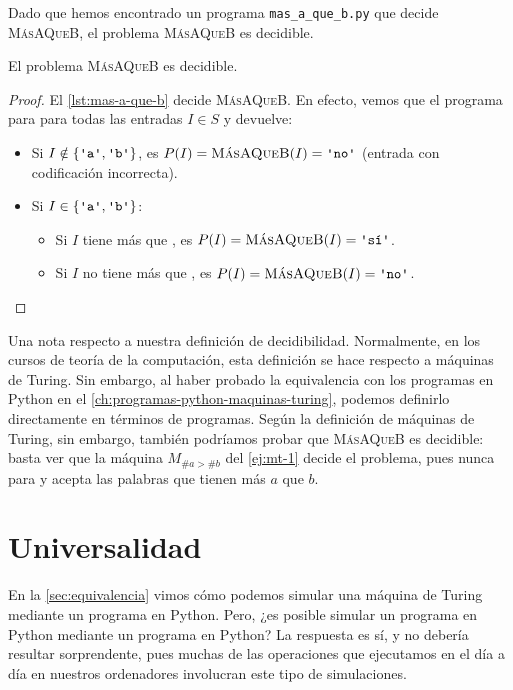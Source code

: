 Dado que hemos encontrado un programa \texttt{mas\_a\_que\_b.py} que decide \textsc{MásAQueB}, el problema \textsc{MásAQueB} es decidible.

\begin{proposicion}\label{prop:masaqueb-decidible}
El problema \textsc{MásAQueB} es decidible.
\end{proposicion}
\begin{proof}
El \cref{lst:mas-a-que-b} decide \textsc{MásAQueB}. En efecto, vemos que el programa para para todas las entradas $I\in S$ y devuelve:
\begin{itemize}
    \item Si $I \notin \{\palabra{a}, \palabra{b}\}$, es $P(I)=\textsc{MásAQueB}(I)=\palabra{no}$ (entrada con codificación incorrecta).
    \item Si $I \in \{\palabra{a}, \palabra{b}\}$:
    \begin{itemize}
        \item Si $I$ tiene más  que , es $P(I)=\textsc{MásAQueB}(I)=\palabra{sí}$.
        \item Si $I$ no tiene más  que , es $P(I)=\textsc{MásAQueB}(I)=\palabra{no}$. \vspace*{-0.8cm}
    \end{itemize}
\end{itemize}
\end{proof}

Una nota respecto a nuestra definición de decidibilidad. Normalmente, en los cursos de teoría de la computación, esta definición se hace respecto a máquinas de Turing. Sin embargo, al haber probado la equivalencia con los programas en Python en el \cref{ch:programas-python-maquinas-turing}, podemos definirlo directamente en términos de programas. Según la definición de máquinas de Turing, sin embargo, también podríamos probar que \textsc{MásAQueB} es decidible: basta ver que la máquina $M_{\#a>\#b}$ del \cref{ej:mt-1} decide el problema, pues nunca para y acepta las palabras que tienen más $a$ que $b$.

\section{Universalidad}\label{sec:universalidad}

En la \cref{sec:equivalencia} vimos cómo podemos simular una máquina de Turing mediante un programa en Python. Pero, ¿es posible simular un programa en Python mediante un programa en Python? La respuesta es sí, y no debería resultar sorprendente, pues muchas de las operaciones que ejecutamos en el día a día en nuestros ordenadores involucran este tipo de simulaciones.

